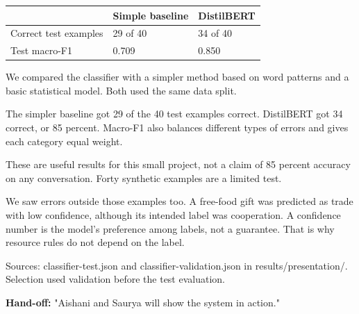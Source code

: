 \documentclass[11pt,a4paper]{article}
\newcommand{\pagehead}[3]{\clearpage{\color{forest}\small\ttfamily #1 \hfill #3}\par\vspace{3pt}{\LARGE\bfseries #2}\par\vspace{5pt}}
\newcommand{\captiontext}[1]{{\footnotesize\color{muted}#1\par}}
\newcommand{\handoff}[1]{\vfill{\small\color{forest}\textbf{Hand-off:} #1}\par}
\begin{document}
\pagehead{RESULTS}{What the classifier actually achieved}{Gayatri}
\label{results}
\begin{center}
\end{center}
\begin{tabularx}{\linewidth}{@{}lYY@{}}
\toprule & \textbf{Simple baseline} & \textbf{DistilBERT}\\\midrule
Correct test examples & 29 of 40 & 34 of 40\\
Test macro-F1 & 0.709 & 0.850\\
\bottomrule
\end{tabularx}
\begin{saybox}
We compared the classifier with a simpler method based on word patterns and a basic statistical model. Both used the same data split.

The simpler baseline got 29 of the 40 test examples correct. DistilBERT got 34 correct, or 85 percent. Macro-F1 also balances different types of errors and gives each category equal weight.

These are useful results for this small project, not a claim of 85 percent accuracy on any conversation. Forty synthetic examples are a limited test.

We saw errors outside those examples too. A free-food gift was predicted as trade with low confidence, although its intended label was cooperation. A confidence number is the model's preference among labels, not a guarantee. That is why resource rules do not depend on the label.
\end{saybox}
\captiontext{Sources: classifier-test.json and classifier-validation.json in results/presentation/. Selection used validation before the test evaluation.}
\handoff{"Aishani and Saurya will show the system in action."}
\end{document}

